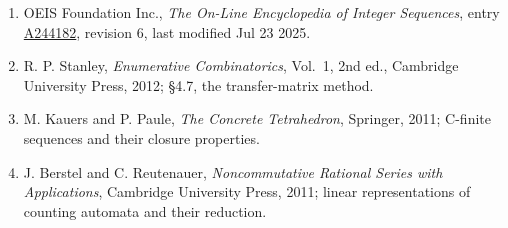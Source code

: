 \documentclass[11pt]{article}
\theoremstyle{definition}
\begin{document}
\begin{enumerate}

\item OEIS Foundation Inc., \emph{The On-Line Encyclopedia of Integer Sequences}, entry \href{https://oeis.org/A244182}{A244182}, revision 6, last modified Jul 23 2025.

\item R. P. Stanley, \emph{Enumerative Combinatorics}, Vol.~1, 2nd ed., Cambridge University Press, 2012; \S4.7, the transfer-matrix method.

\item M. Kauers and P. Paule, \emph{The Concrete Tetrahedron}, Springer, 2011; C-finite sequences and their closure properties.

\item J. Berstel and C. Reutenauer, \emph{Noncommutative Rational Series with Applications}, Cambridge University Press, 2011; linear representations of counting automata and their reduction.

\end{enumerate}
\end{document}
